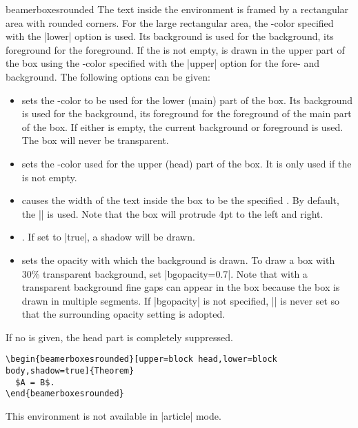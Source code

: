 \begin{environment}{{beamerboxesrounded}}
  The text inside the environment is framed by a rectangular area with rounded corners. For the large rectangular area, the \beamer-color specified with the |lower| option  is used. Its background is used for the background, its foreground for the foreground. If the  is not empty,  is drawn in the upper part of the box using the \beamer-color specified with the |upper| option for the fore- and background. The following options can be given:
  \begin{itemize}
  \item
     sets the \beamer-color to be used for the lower (main) part of the box. Its background is used for the background, its foreground for the foreground of the main part of the box. If either is empty, the current background or foreground is used. The box will never be transparent.
  \item
     sets the \beamer-color used for the upper (head) part of the box. It is only used if the  is not empty.
  \item
     causes the width of the text inside the box to be the specified . By default, the |\textwidth| is used. Note that the box will protrude 4pt to the left and right.
  \item
    . If set to |true|, a shadow will be drawn.
  \item
     sets the opacity with which the background is drawn. To draw a box with 30\% transparent background, set |bgopacity=0.7|. Note that with a transparent background fine gaps can appear in the box because the box is drawn in multiple segments. If |bgopacity| is not specified, |\pgfsetfillopacity| is never set so that the surrounding opacity setting is adopted.
  \end{itemize}
  If no  is given, the head part is completely suppressed.
  \example
\begin{verbatim}
\begin{beamerboxesrounded}[upper=block head,lower=block body,shadow=true]{Theorem}
  $A = B$.
\end{beamerboxesrounded}
\end{verbatim}

  \articlenote
  This environment is not available in |article| mode.
\end{environment}


